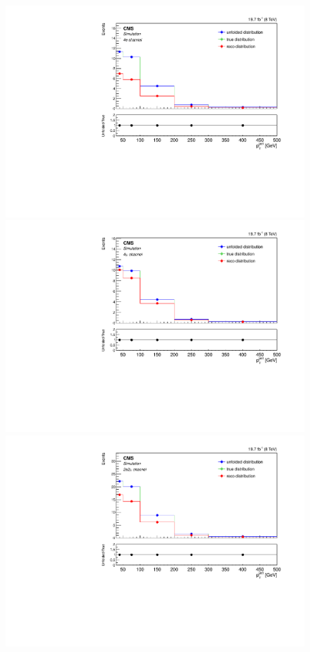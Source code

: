 \begin{figure}[hbtp]
\begin{center}
     \includegraphics[width=0.8\cmsFigWidth]{Figures/Unfolding/MCTests/PtJet1_ZZTo4e_PowMatrix_PowDistr_FullSample_fr}     
    \includegraphics[width=0.8\cmsFigWidth]{Figures/Unfolding/MCTests/PtJet1_ZZTo4m_PowMatrix_PowDistr_FullSample_fr}     
    \includegraphics[width=0.8\cmsFigWidth]{Figures/Unfolding/MCTests/PtJet1_ZZTo2e2m_PowMatrix_PowDistr_FullSample_fr}      

\end{center}
\end{figure}
